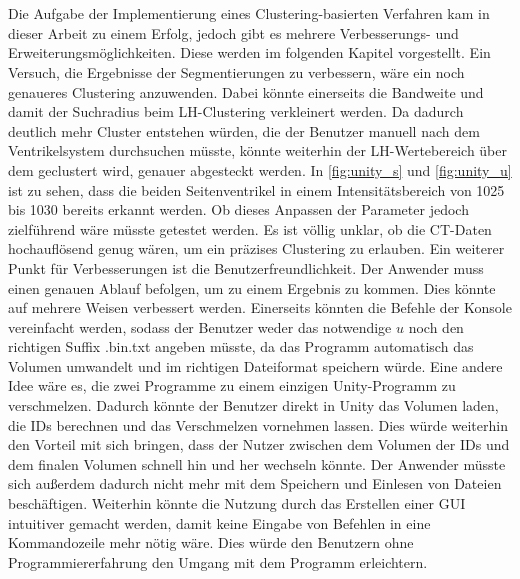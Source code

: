 \chapter{}
\label{sec:conclusion}



Die Aufgabe der Implementierung eines Clustering-basierten Verfahren kam in dieser Arbeit zu einem Erfolg, jedoch gibt es mehrere Verbesserungs- und Erweiterungsmöglichkeiten. Diese werden im folgenden Kapitel vorgestellt.
\newline
Ein Versuch, die Ergebnisse der Segmentierungen zu verbessern, wäre ein noch genaueres Clustering anzuwenden. Dabei könnte einerseits die Bandweite und damit der Suchradius beim LH-Clustering verkleinert werden. Da dadurch deutlich mehr Cluster entstehen würden, die der Benutzer manuell nach dem Ventrikelsystem durchsuchen müsste, könnte weiterhin der LH-Wertebereich über dem geclustert wird, genauer abgesteckt werden. In \autoref{fig:unity_s} und \autoref{fig:unity_u} ist zu sehen, dass die beiden Seitenventrikel in einem Intensitätsbereich von 1025 bis 1030 bereits erkannt werden. Ob dieses Anpassen der Parameter jedoch zielführend wäre müsste getestet werden. Es ist völlig unklar, ob die CT-Daten hochauflösend genug wären, um ein präzises Clustering zu erlauben.
\newline
Ein weiterer Punkt für Verbesserungen ist die Benutzerfreundlichkeit. Der Anwender muss einen genauen Ablauf befolgen, um zu einem Ergebnis zu kommen. Dies könnte auf mehrere Weisen verbessert werden. Einerseits könnten die Befehle der Konsole vereinfacht werden, sodass der Benutzer weder das notwendige $u$ noch den richtigen Suffix .bin.txt  angeben müsste, da das Programm automatisch das Volumen umwandelt und im richtigen Dateiformat speichern würde.
\newline
Eine andere Idee wäre es, die zwei Programme zu einem einzigen Unity-Programm zu verschmelzen. Dadurch könnte der Benutzer direkt in Unity das Volumen laden, die IDs berechnen und das Verschmelzen vornehmen lassen. Dies würde weiterhin den Vorteil mit sich bringen, dass der Nutzer zwischen dem Volumen der IDs und dem finalen Volumen schnell hin und her wechseln könnte. Der Anwender müsste sich außerdem dadurch nicht mehr mit dem Speichern und Einlesen von Dateien beschäftigen. Weiterhin könnte die Nutzung durch das Erstellen einer GUI intuitiver gemacht werden, damit keine Eingabe von Befehlen in eine Kommandozeile mehr nötig wäre. Dies würde den Benutzern ohne Programmiererfahrung den Umgang mit dem Programm erleichtern.
